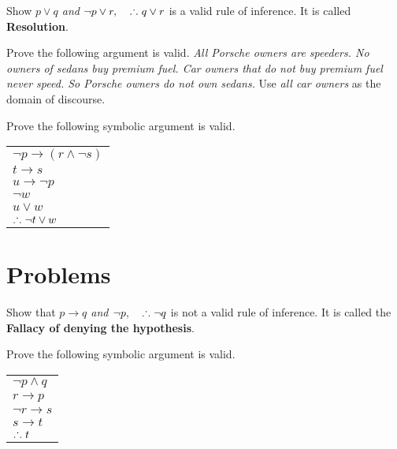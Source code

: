 \begin{exer}
  Show {\itshape $p\lor q$ and $\neg p \lor r, \quad \thus q\lor r$} is a valid rule
of inference.  It is called {\bfseries Resolution}.
\end{exer}

\begin{exer}
Prove the following argument is valid. {\itshape All Porsche owners are 
speeders. No owners of sedans buy premium fuel.  Car owners that do not buy
premium fuel never speed. So Porsche owners do not own sedans.}
Use {\itshape all car owners} as the domain of discourse.
\end{exer}

\begin{exer}
Prove the following symbolic argument is valid.
\begin{center}
  \begin{tabular}{l}
  $\lnot p\to (r \land \lnot s)$  \\ 
  $ t\to s$   \\ 
  $u\to \lnot p$   \\ 
  $\lnot w$ \\
  $u \lor w$   \\ 
  \hline
  $\thus  \lnot t \lor w$
  \end{tabular}
\end{center}
\end{exer}



\clearpage
\section{Problems}


\begin{prob}
  Show that {\itshape $p\to q$ and $\neg p,\quad \thus \neg q$} is not a valid rule
of inference. It is called the \textbf{Fallacy of denying the hypothesis}. 

\end{prob}

\begin{prob}
Prove the following symbolic argument is valid.
\begin{center}
  \begin{tabular}{l}
  $\lnot p\land  q$  \\ 
  $ r\to p$   \\ 
  $\neg r\to s$   \\ 
  $s\to t$   \\ 
  \hline
  $\thus  t$
  \end{tabular}
\end{center}
\end{prob}

